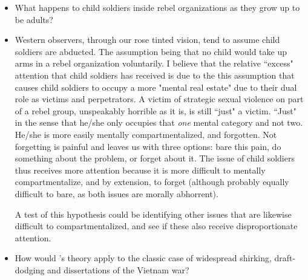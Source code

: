 \documentclass[12pt]{article}
\begin{document}
\begin{itemize}

	\item What happens to child soldiers inside rebel organizations as they
		grow up to be adults?

	\item Western observers, through our rose tinted vision, tend to assume
		child soldiers are abducted. The assumption being that no child
		would take up arms in a rebel organization voluntarily. I
		believe that the relative ``excess" attention that child
		soldiers has received is due to the this assumption that causes
		child soldiers to occupy a more "mental real estate" due to
		their dual role as victims and perpetrators. A victim of
		strategic sexual violence on part of a rebel group, unspeakably
		horrible as it is, is still ``just" a victim.  ``Just" in the
		sense that he/she only occupies that \textit{one} mental
		category and not two. He/she is more easily mentally
		compartmentalized, and forgotten. Not forgetting is painful and
		leaves us with three options: bare this pain, do something about
		the problem, or forget about it. The issue of child soldiers
		thus receives more attention because it is more difficult to
		mentally compartmentalize, and by extension, to forget (although
		probably equally difficult to bare, as both issues are morally
		abhorrent).

		A test of this hypothesis could be identifying other issues that
		are likewise difficult to compartmentalized, and see if these
		also receive disproportionate attention.

	\item How would \citet{Manekin_2017}'s theory apply to the classic case
		of widespread shirking, draft-dodging and dissertations of the
		Vietnam war?

\end{itemize}

\pagebreak



\end{document}
